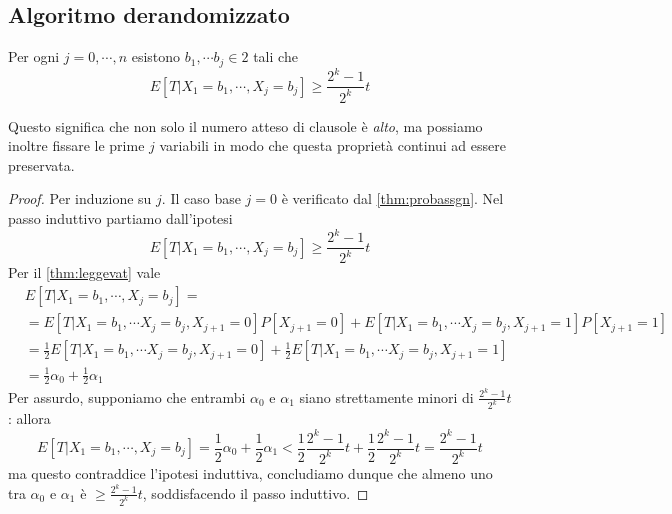 \subsection{Algoritmo derandomizzato}
\begin{theorem}\label{thm:maxsatderandomexv}
	Per ogni $j  = 0, \cdots, n$ esistono $b_1, \cdots b_j \in 2$ tali che
	$$
		E[T|X_1 = b_1, \cdots, X_j = b_j] \geq \frac{2^k-1}{2^k}t
	$$
\end{theorem}
Questo significa che non solo il numero atteso di clausole è \textit{alto}, ma
possiamo inoltre fissare le prime $j$ variabili in modo che questa proprietà
continui ad essere preservata.
\begin{proof}
	Per induzione su $j$.
	Il caso base $j = 0$ è verificato dal \cref{thm:probassgn}.
	Nel passo induttivo partiamo dall'ipotesi
	$$
		E[T|X_1 = b_1, \cdots, X_j = b_j] \geq \frac{2^k-1}{2^k}t
	$$
	Per il \cref{thm:leggevat} vale
	\begin{align*}
		&E[T|X_1 = b_1, \cdots, X_j = b_j] = \\
		&= E[T | X_1 = b_1, \cdots X_j = b_j, X_{j+1} = 0] P[X_{j+1} = 0] + E[T | X_1 = b_1, \cdots X_j = b_j, X_{j+1} = 1]P[X_{j+1} = 1]	\\
		&= \frac{1}{2} E[T | X_1 = b_1, \cdots X_j = b_j, X_{j+1} = 0] + \frac{1}{2} E[T | X_1 = b_1, \cdots X_j = b_j, X_{j+1} = 1]		\\
		&= \frac{1}{2} \alpha_0 + \frac{1}{2} \alpha_1
	\end{align*}
	Per assurdo, supponiamo che entrambi $\alpha_0$ e $\alpha_1$ siano
	strettamente minori di $\frac{2^k-1}{2^k}t$: allora
	$$
		E[T|X_1 = b_1, \cdots, X_j = b_j] = \frac{1}{2} \alpha_0 + \frac{1}{2} \alpha_1 < \frac{1}{2}\frac{2^k -1 }{2^k} t + \frac{1}{2} \frac{2^k -1 }{2^k} t = \frac{2^k -1 }{2^k} t
	$$
	ma questo contraddice l'ipotesi induttiva, concludiamo dunque che almeno
	uno tra $\alpha_0$ e $\alpha_1$ è $\geq \frac{2^k-1}{2^k}t$, soddisfacendo
	il passo induttivo.
\end{proof}

